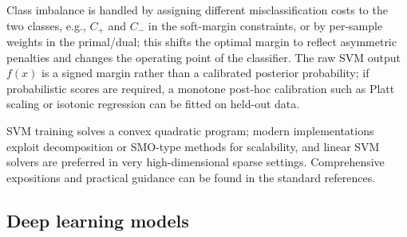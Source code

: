 Class imbalance is handled by assigning different misclassification costs to the two classes, e.g., $C_+$ and $C_-$ in the soft-margin constraints, or by per-sample weights in the primal/dual; this shifts the optimal margin to reflect asymmetric penalties and changes the operating point of the classifier. The raw SVM output $f(x)$ is a signed margin rather than a calibrated posterior probability; if probabilistic scores are required, a monotone post-hoc calibration such as Platt scaling or isotonic regression can be fitted on held-out data.

SVM training solves a convex quadratic program; modern implementations exploit decomposition or SMO-type methods for scalability, and linear SVM solvers are preferred in very high-dimensional sparse settings. Comprehensive expositions and practical guidance can be found in the standard references.




\subsection{Deep learning models}

